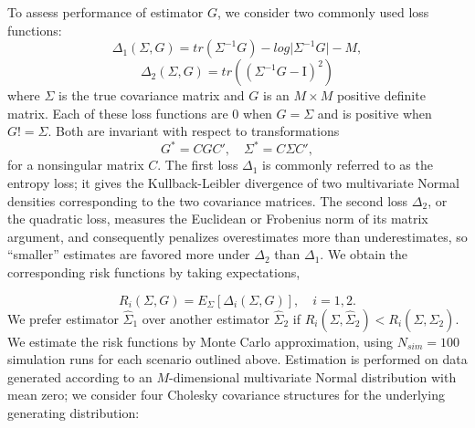 \documentclass[12pt]{article}
\theoremstyle{definition}
\begin{document}
To assess performance of estimator $G$, we consider two commonly used loss functions:
\begin{equation}
\Delta_1\left(\Sigma,G \right) = tr\left( \Sigma^{-1} G \right) - log \vert \Sigma^{-1} G \vert - M,
\end{equation}
\noindent
\begin{equation}
\Delta_2\left(\Sigma,G\right) = tr\left(\left( \Sigma^{-1} G - \mathrm{I}\right)^2 \right)
\end{equation}
\noindent
where $\Sigma$ is the true covariance matrix and $G$ is an $M \times M$ positive definite matrix. Each of these loss functions are $0$ when $G = \Sigma$ and is positive when $G != \Sigma$. Both are invariant with respect to transformations
\[
G^* = C G C', \quad \Sigma^* = C \Sigma C',
\]
\noindent
for a nonsingular matrix $C$. The first loss $\Delta_1$ is commonly referred to as the entropy loss; it gives the Kullback-Leibler divergence of two multivariate Normal densities corresponding to the two covariance matrices. The second loss $\Delta_2$, or the quadratic loss, measures the Euclidean or Frobenius norm of its matrix argument, and consequently penalizes overestimates more than underestimates, so ``smaller'' estimates are favored more under $\Delta_2$ than $\Delta_1$. We obtain the corresponding risk functions by taking expectations,

\begin{equation*}
R_i \left(\Sigma, G\right) = E_\Sigma\left[\Delta_i\left(\Sigma,G\right)\right], \quad i = 1,2.
\end{equation*}
\noindent
We prefer estimator $\hat{\Sigma}_1$ over another estimator $\hat{\Sigma}_2$ if $R_i \left(\Sigma, \hat{\Sigma}_2\right) < R_i \left(\Sigma, \hat{\Sigma}_2\right)$. We estimate the risk functions by Monte Carlo approximation, using $N_{sim} = 100$ simulation runs for each scenario outlined above.  Estimation is performed on data generated according to an $M$-dimensional multivariate Normal distribution with mean zero; we consider four Cholesky covariance structures for the underlying generating distribution:
\end{document}
